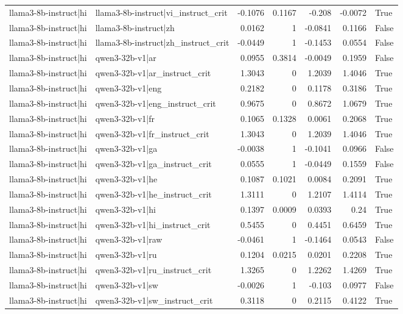 \begin{table}
\begin{tabular}{l l r r r r l}
llama3-8b-instruct|hi & llama3-8b-instruct|vi_instruct_crit & -0.1076 & 0.1167 & -0.208 & -0.0072 & True \\
llama3-8b-instruct|hi & llama3-8b-instruct|zh & 0.0162 & 1 & -0.0841 & 0.1166 & False \\
llama3-8b-instruct|hi & llama3-8b-instruct|zh_instruct_crit & -0.0449 & 1 & -0.1453 & 0.0554 & False \\
llama3-8b-instruct|hi & qwen3-32b-v1|ar & 0.0955 & 0.3814 & -0.0049 & 0.1959 & False \\
llama3-8b-instruct|hi & qwen3-32b-v1|ar_instruct_crit & 1.3043 & 0 & 1.2039 & 1.4046 & True \\
llama3-8b-instruct|hi & qwen3-32b-v1|eng & 0.2182 & 0 & 0.1178 & 0.3186 & True \\
llama3-8b-instruct|hi & qwen3-32b-v1|eng_instruct_crit & 0.9675 & 0 & 0.8672 & 1.0679 & True \\
llama3-8b-instruct|hi & qwen3-32b-v1|fr & 0.1065 & 0.1328 & 0.0061 & 0.2068 & True \\
llama3-8b-instruct|hi & qwen3-32b-v1|fr_instruct_crit & 1.3043 & 0 & 1.2039 & 1.4046 & True \\
llama3-8b-instruct|hi & qwen3-32b-v1|ga & -0.0038 & 1 & -0.1041 & 0.0966 & False \\
llama3-8b-instruct|hi & qwen3-32b-v1|ga_instruct_crit & 0.0555 & 1 & -0.0449 & 0.1559 & False \\
llama3-8b-instruct|hi & qwen3-32b-v1|he & 0.1087 & 0.1021 & 0.0084 & 0.2091 & True \\
llama3-8b-instruct|hi & qwen3-32b-v1|he_instruct_crit & 1.3111 & 0 & 1.2107 & 1.4114 & True \\
llama3-8b-instruct|hi & qwen3-32b-v1|hi & 0.1397 & 0.0009 & 0.0393 & 0.24 & True \\
llama3-8b-instruct|hi & qwen3-32b-v1|hi_instruct_crit & 0.5455 & 0 & 0.4451 & 0.6459 & True \\
llama3-8b-instruct|hi & qwen3-32b-v1|raw & -0.0461 & 1 & -0.1464 & 0.0543 & False \\
llama3-8b-instruct|hi & qwen3-32b-v1|ru & 0.1204 & 0.0215 & 0.0201 & 0.2208 & True \\
llama3-8b-instruct|hi & qwen3-32b-v1|ru_instruct_crit & 1.3265 & 0 & 1.2262 & 1.4269 & True \\
llama3-8b-instruct|hi & qwen3-32b-v1|sw & -0.0026 & 1 & -0.103 & 0.0977 & False \\
llama3-8b-instruct|hi & qwen3-32b-v1|sw_instruct_crit & 0.3118 & 0 & 0.2115 & 0.4122 & True \\

\end{tabular}
\end{table}
